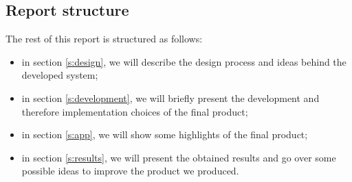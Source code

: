 \documentclass[../../main]{subfiles}
\begin{document}
\subsection{Report structure}
\label{ss:report-structure}

The rest of this report is structured as follows:
\begin{itemize}
    \item in section \ref{s:design}, we will describe the design process and ideas behind the developed system;
    \item in section \ref{s:development}, we will briefly present the development and therefore implementation choices of the final product;
    \item in section \ref{s:app}, we will show some highlights of the final product;
    \item in section \ref{s:results}, we will present the obtained results and go over some possible ideas to improve the product we produced.
\end{itemize}
\end{document}
